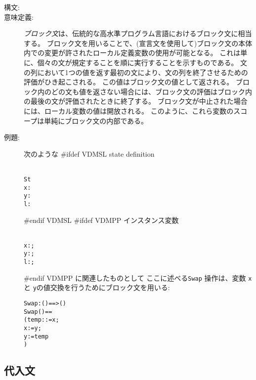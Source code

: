 \documentclass[\pformat,12pt]{jarticle}
\begin{document}
\begin{description}
\item[構文:]




\item[意味定義:] {\it ブロック文}は、伝統的な高水準プログラム言語におけるブロック文に相当する。
ブロック文を用いることで、(宣言文を使用して)ブロック文の本体内での変更が許されたローカル定義変数の使用が可能となる。
これは単に、個々の文が規定することを順に実行することを示すものである。
文の列において1つの値を返す最初の文により、文の列を終了させるための評価がひき起こされる。
この値はブロック文の値として返される。
ブロック内のどの文も値を返さない場合には、ブロック文の評価はブロック内の最後の文が評価されたときに終了する。
ブロック文が中止された場合には、ローカル変数の値は開放される。
このように、これら変数のスコープは単純にブロック文の内部である。
      
\item[例題:] 次のような
#ifdef VDMSL
state definition
  \begin{alltt}\label{stdef}
   St 
    x:
    y:
    l:
  \end{alltt}
#endif VDMSL
#ifdef VDMPP
インスタンス変数
  \begin{alltt}\label{stdef}
    x:;
    y:;
    l:;
  \end{alltt}
#endif VDMPP
に関連したものとして
ここに述べる\texttt{Swap} 操作は、変数 \texttt{x} と \texttt{y}の値交換を行うためにブロック文を用いる:
  \begin{alltt}
  Swap : () ==> ()
  Swap () ==
    ( temp:  := x;
     x := y;
     y := temp
    )
  \end{alltt}

\end{description}

\subsection{代入文}
\end{document}
